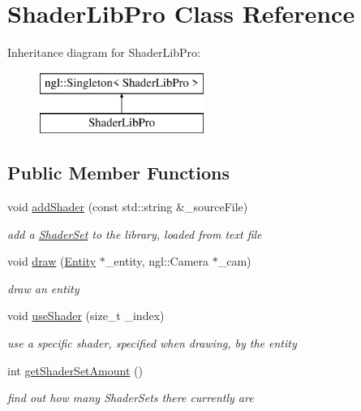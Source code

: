 \hypertarget{class_shader_lib_pro}{\section{Shader\-Lib\-Pro Class Reference}
\label{class_shader_lib_pro}
}
Inheritance diagram for Shader\-Lib\-Pro\-:\begin{figure}[H]
\begin{center}
\leavevmode
\includegraphics[height=2.000000cm]{class_shader_lib_pro}
\end{center}
\end{figure}
\subsection*{Public Member Functions}
\begin{DoxyCompactItemize}
\item 
void \hyperlink{class_shader_lib_pro_a7a12f281cef251008a3ccbc04fd2fb52}{add\-Shader} (const std\-::string \&\-\_\-source\-File)
\begin{DoxyCompactList}\small\item\em add a \hyperlink{class_shader_set}{Shader\-Set} to the library, loaded from text file \end{DoxyCompactList}\item 
void \hyperlink{class_shader_lib_pro_ae7059e210cd4fc739d12209e904dea75}{draw} (\hyperlink{class_entity}{Entity} $\ast$\-\_\-entity, ngl\-::\-Camera $\ast$\-\_\-cam)
\begin{DoxyCompactList}\small\item\em draw an entity \end{DoxyCompactList}\item 
void \hyperlink{class_shader_lib_pro_a9401ba0fe34177ba6955ce769cec1f9b}{use\-Shader} (size\-\_\-t \-\_\-index)
\begin{DoxyCompactList}\small\item\em use a specific shader, specified when drawing, by the entity \end{DoxyCompactList}\item 
int \hyperlink{class_shader_lib_pro_a16e8698616a023de15e48b8107d2d1d4}{get\-Shader\-Set\-Amount} ()
\begin{DoxyCompactList}\small\item\em find out how many Shader\-Sets there currently are \end{DoxyCompactList}\end{DoxyCompactItemize}
